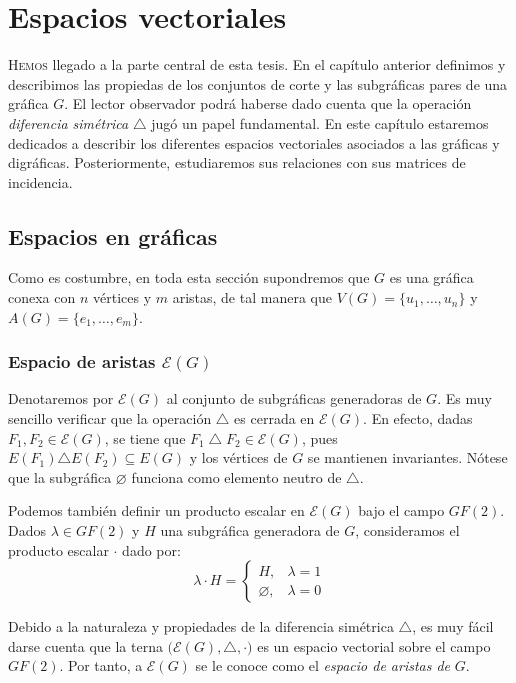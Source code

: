 \chapter{Espacios vectoriales}

\lettrine[lines=6] {\initfamily \selectfont H} {emos} llegado a la parte central de esta tesis. En el capítulo anterior definimos y describimos las propiedas de los conjuntos de corte y las subgráficas pares de una gráfica $G$. El lector observador podrá haberse dado cuenta que la operación \textit{diferencia simétrica} $\triangle$ jugó un papel fundamental. En este capítulo estaremos dedicados a describir los diferentes espacios vectoriales asociados a las gráficas y digráficas. Posteriormente, estudiaremos sus relaciones con sus matrices de incidencia.

\section{Espacios en gráficas}
Como es costumbre, en toda esta sección supondremos que $G$ es una gráfica conexa con $n$ vértices y $m$ aristas, de tal manera que $V(G)=\{u_{1}, \ldots, u_{n}\}$ y $A(G) = \{e_{1}, \ldots, e_{m}\}$.

\subsection{Espacio de aristas $\mathcal{E}(G)$}
Denotaremos por $\mathcal{E}(G)$ al conjunto de subgráficas generadoras de $G$.
Es muy sencillo verificar que la operación $\triangle$ es cerrada en $\mathcal{E}(G)$. En efecto, dadas $F_{1}, F_{2} \in \mathcal{E}(G)$, se tiene que  $F_{1} \bigtriangleup F_{2} \in \mathcal{E}(G)$, pues $E(F_{1}) \triangle E(F_{2}) \subseteq E(G)$ y los vértices de $G$ se mantienen invariantes. Nótese que la subgráfica $\varnothing$ funciona como elemento neutro de $\triangle$.

Podemos también definir un producto escalar en $\mathcal{E}(G)$ bajo el campo $GF(2)$. Dados $\lambda \in GF(2)$ y $H$ una subgráfica generadora de $G$, consideramos el producto escalar $\cdot$ dado por:
$$
\lambda \cdot H =\left\{\begin{matrix}
H, & \lambda = 1  \\
\varnothing, & \lambda = 0
\end{matrix}\right.
$$

Debido a la naturaleza y propiedades de la diferencia simétrica $\triangle$, es muy fácil darse cuenta que la terna $\Big(\mathcal{E}(G), \triangle, \cdot\Big)$ es un espacio vectorial sobre el campo $GF(2)$. Por tanto, a $\mathcal{E}(G)$ se le conoce como el \textit{espacio de aristas de} $G$. 

